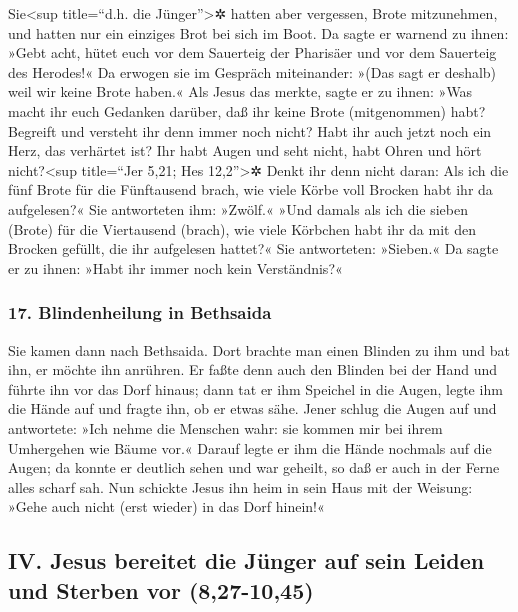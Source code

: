  Sie\textless sup title=``d.h. die Jünger''\textgreater✲
hatten aber vergessen, Brote mitzunehmen, und hatten nur ein einziges
Brot bei sich im Boot.  Da sagte er warnend zu ihnen:
»Gebt acht, hütet euch vor dem Sauerteig der Pharisäer und vor dem
Sauerteig des Herodes!«  Da erwogen sie im Gespräch
miteinander: »(Das sagt er deshalb) weil wir keine Brote haben.«
 Als Jesus das merkte, sagte er zu ihnen: »Was macht ihr
euch Gedanken darüber, daß ihr keine Brote (mitgenommen) habt? Begreift
und versteht ihr denn immer noch nicht? Habt ihr auch jetzt noch ein
Herz, das verhärtet ist?  Ihr habt Augen und seht nicht,
habt Ohren und hört nicht?\textless sup title=``Jer 5,21; Hes
12,2''\textgreater✲ Denkt ihr denn nicht daran:  Als ich
die fünf Brote für die Fünftausend brach, wie viele Körbe voll Brocken
habt ihr da aufgelesen?« Sie antworteten ihm: »Zwölf.« 
»Und damals als ich die sieben (Brote) für die Viertausend (brach), wie
viele Körbchen habt ihr da mit den Brocken gefüllt, die ihr aufgelesen
hattet?« Sie antworteten: »Sieben.«  Da sagte er zu
ihnen: »Habt ihr immer noch kein Verständnis?«

\hypertarget{blindenheilung-in-bethsaida}{%
\subsubsection{17. Blindenheilung in
Bethsaida}\label{blindenheilung-in-bethsaida}}

 Sie kamen dann nach Bethsaida. Dort brachte man einen
Blinden zu ihm und bat ihn, er möchte ihn anrühren.  Er
faßte denn auch den Blinden bei der Hand und führte ihn vor das Dorf
hinaus; dann tat er ihm Speichel in die Augen, legte ihm die Hände auf
und fragte ihn, ob er etwas sähe.  Jener schlug die Augen
auf und antwortete: »Ich nehme die Menschen wahr: sie kommen mir bei
ihrem Umhergehen wie Bäume vor.«  Darauf legte er ihm die
Hände nochmals auf die Augen; da konnte er deutlich sehen und war
geheilt, so daß er auch in der Ferne alles scharf sah. 
Nun schickte Jesus ihn heim in sein Haus mit der Weisung: »Gehe auch
nicht (erst wieder) in das Dorf hinein!«

\hypertarget{iv.-jesus-bereitet-die-juxfcnger-auf-sein-leiden-und-sterben-vor-827-1045}{%
\subsection{IV. Jesus bereitet die Jünger auf sein Leiden und Sterben
vor
(8,27-10,45)}\label{iv.-jesus-bereitet-die-juxfcnger-auf-sein-leiden-und-sterben-vor-827-1045}}

